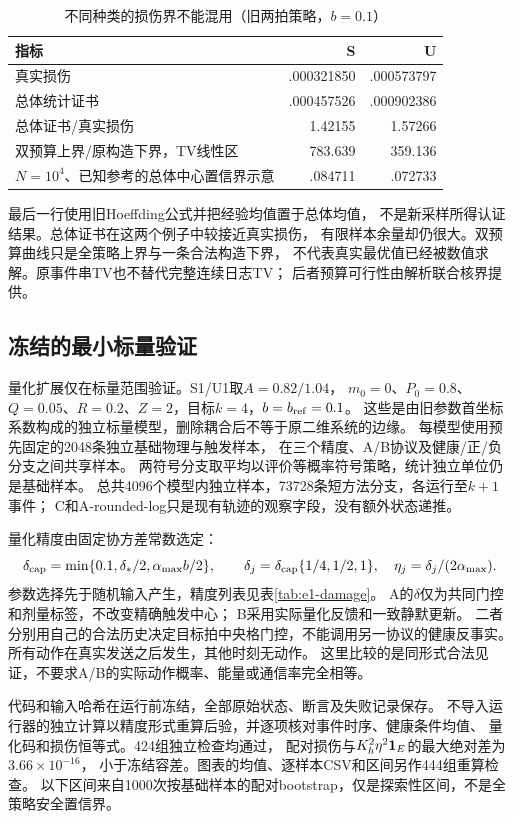 \begin{table}[ht]
\centering\small
\caption{不同种类的损伤界不能混用（旧两拍策略，$b=0.1$）}
\begin{tabular}{lrr}
\toprule
指标 & S & U\\
\midrule
真实损伤 & .000321850 & .000573797\\
总体统计证书 & .000457526 & .000902386\\
总体证书/真实损伤 & 1.42155 & 1.57266\\
双预算上界/原构造下界，TV线性区 & 783.639 & 359.136\\
$N=10^4$、已知参考的总体中心置信界示意 & .084711 & .072733\\
\bottomrule
\end{tabular}
\end{table}
最后一行使用旧Hoeffding公式并把经验均值置于总体均值，
不是新采样所得认证结果。总体证书在这两个例子中较接近真实损伤，
有限样本余量却仍很大。双预算曲线只是全策略上界与一条合法构造下界，
不代表真实最优值已经被数值求解。原事件串TV也不替代完整连续日志TV；
后者预算可行性由解析联合核界提供。

\subsection{冻结的最小标量验证}
量化扩展仅在标量范围验证。S1/U1取$A=0.82/1.04$，
$m_0=0$、$P_0=0.8$、$Q=0.05$、$R=0.2$、$Z=2$，目标$k=4$，$b=b_{\rm ref}=0.1$。
这些是由旧参数首坐标系数构成的独立标量模型，删除耦合后不等于原二维系统的边缘。
每模型使用预先固定的2048条独立基础物理与触发样本，
在三个精度、A/B协议及健康/正/负分支之间共享样本。
两符号分支取平均以评价等概率符号策略，统计独立单位仍是基础样本。
总共4096个模型内独立样本，73728条短方法分支，各运行至$k+1$事件；
C和A-rounded-log只是现有轨迹的观察字段，没有额外状态递推。

量化精度由固定协方差常数选定：
\[
\delta_{\rm cap}=\min\{0.1,\delta_*/2,\alpha_{\max}b/2\},\qquad
\delta_j=\delta_{\rm cap}\{1/4,1/2,1\},\quad
\eta_j=\delta_j/(2\alpha_{\max}).
\]
参数选择先于随机输入产生，精度列表见表\ref{tab:e1-damage}。
A的$\delta$仅为共同门控和剂量标签，不改变精确触发中心；
B采用实际量化反馈和一致静默更新。
二者分别用自己的合法历史决定目标拍中央格门控，不能调用另一协议的健康反事实。
所有动作在真实发送之后发生，其他时刻无动作。
这里比较的是同形式合法见证，不要求A/B的实际动作概率、能量或通信率完全相等。

代码和输入哈希在运行前冻结，全部原始状态、断言及失败记录保存。
不导入运行器的独立计算以精度形式重算后验，并逐项核对事件时序、健康条件均值、
量化码和损伤恒等式。424组独立检查均通过，
配对损伤与$K_h^2\eta^2\mathbf 1_E$的最大绝对差为$3.66\times10^{-16}$，
小于冻结容差。图表的均值、逐样本CSV和区间另作444组重算检查。
以下区间来自1000次按基础样本的配对bootstrap，仅是探索性区间，不是全策略安全置信界。

